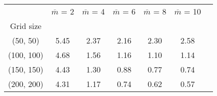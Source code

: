 \begin{tabular}{ccccccc}
\toprule
{} &  $\overline{m}$ = 2 &  $\overline{m}$ = 4 &  $\overline{m}$ = 6 &  $\overline{m}$ = 8 &  $\overline{m}$ = 10 \\
Grid size  &                     &                     &                     &                     &                      \\
\midrule
(50, 50)   &                5.45 &                2.37 &                2.16 &                2.30 &                 2.58 \\
(100, 100) &                4.68 &                1.56 &                1.16 &                1.10 &                 1.14 \\
(150, 150) &                4.43 &                1.30 &                0.88 &                0.77 &                 0.74 \\
(200, 200) &                4.31 &                1.17 &                0.74 &                0.62 &                 0.57 \\
\bottomrule
\end{tabular}
